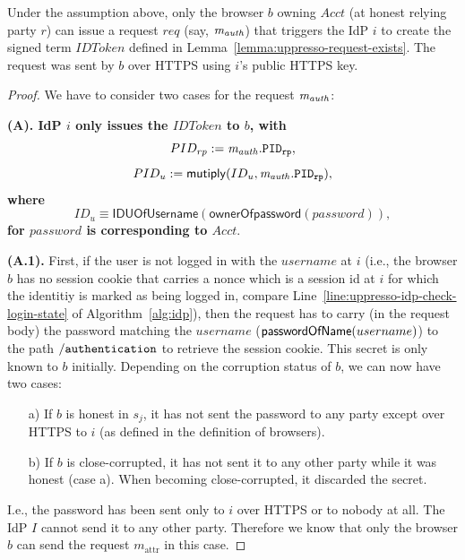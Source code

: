   \begin{lemma}\label{lemma:b-trigger-request}%
    Under the assumption above, only the browser $b$ owning $Acct$ (at honest relying party $r$) can issue a request $req$ (say, $\mathit{m_{auth}}$) that triggers the IdP $i$ to create the signed term $IDToken$ defined in Lemma~\ref{lemma:uppresso-request-exists}. The request was sent by $b$ over HTTPS using $i$'s public HTTPS key.
  \end{lemma}
  \begin{proof}
    We have to consider two cases for the request $\mathit{m_{auth}}$:
  
    \textbf{(A). IdP $i$ only issues the $IDToken$ to $b$, with
    $$ PID_{rp} := \mathit{m_{auth}.\mathtt{PID_{rp}}}, $$ 
    $$ PID_u := \mathsf{mutiply}(ID_u, \mathit{m_{auth}.\mathtt{PID_{rp}}}), $$ 
    where 
    $$ ID_u \equiv \mathsf{IDUOfUsername} (\mathsf{ownerOfpassword}(password)), $$ 
  for $password$ is corresponding to $Acct$}.
    
    \textbf{(A.1).} First, if the user is not logged in with the    $username$ at $i$ (i.e., the browser $b$ has no session cookie that carries a nonce which is a session id at $i$ for which the identitiy is marked as being logged in, compare Line~\ref{line:uppresso-idp-check-login-state} of Algorithm~\ref{alg:idp}), then the request has to carry (in the request body) the password matching the $username$    ($\mathsf{passwordOfName}(username)$) to the path $\mathtt{/authentication}$ to retrieve the session cookie. This secret is only known to $b$ initially. Depending on the corruption status of $b$, we can now have two cases:
    \begin{enumerate}
    \item[a)] If $b$ is honest in $s_j$, it has not sent the 
      password to any party except over HTTPS to $i$ (as defined 
      in the definition of browsers). 
    \item[b)] If $b$ is close-corrupted, it has not sent it to 
      any other party while it was honest (case a). When 
      becoming close-corrupted, it discarded the secret.
    \end{enumerate}
  
    I.e., the password has been sent only to $i$ over HTTPS or 
    to nobody at all. The IdP $I$ cannot send it to any other 
    party. Therefore we know that only the browser $b$ can send 
    the request $m_\text{attr}$ in this case.
  

\end{proof}

